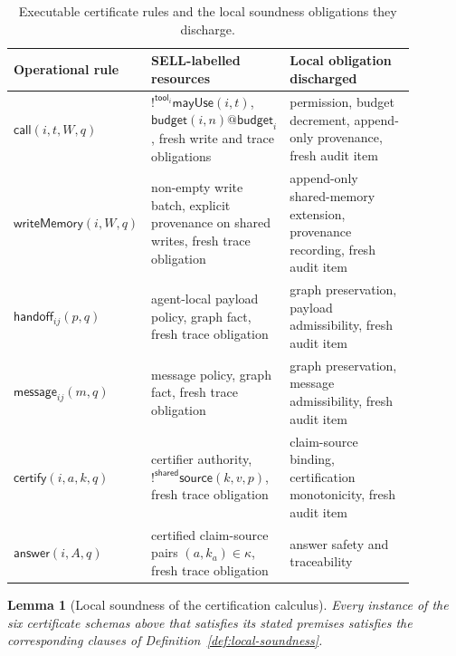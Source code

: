 \documentclass[a4paper,fleqn]{cas-sc}
\newtheorem{lemma}{Lemma}
\begin{document}
\begin{table}[htbp]
\centering
\small
\begin{tabular}{>{\raggedright\arraybackslash}p{0.22\linewidth}>{\raggedright\arraybackslash}p{0.32\linewidth}>{\raggedright\arraybackslash}p{0.34\linewidth}}
\toprule
Operational rule & SELL-labelled resources & Local obligation discharged \\
\midrule
\(\mathsf{call}(i,t,W,q)\) & \(!^{\mathsf{tool}_i}\mathsf{mayUse}(i,t)\), \(\mathsf{budget}(i,n)@\mathsf{budget}_i\), fresh write and trace obligations & permission, budget decrement, append-only provenance, fresh audit item \\
\(\mathsf{writeMemory}(i,W,q)\) & non-empty write batch, explicit provenance on shared writes, fresh trace obligation & append-only shared-memory extension, provenance recording, fresh audit item \\
\(\mathsf{handoff}_{ij}(p,q)\) & agent-local payload policy, graph fact, fresh trace obligation & graph preservation, payload admissibility, fresh audit item \\
\(\mathsf{message}_{ij}(m,q)\) & message policy, graph fact, fresh trace obligation & graph preservation, message admissibility, fresh audit item \\
\(\mathsf{certify}(i,a,k,q)\) & certifier authority, \(!^{\mathsf{shared}}\mathsf{source}(k,v,p)\), fresh trace obligation & claim-source binding, certification monotonicity, fresh audit item \\
\(\mathsf{answer}(i,A,q)\) & certified claim-source pairs \((a,k_a)\in\kappa\), fresh trace obligation & answer safety and traceability \\
\bottomrule
\end{tabular}
\caption{Executable certificate rules and the local soundness obligations they discharge.}
\label{tab:certificate-obligations}
\end{table}

\begin{lemma}[Local soundness of the certification calculus]\label{lem:calculus-local-soundness}
Every instance of the six certificate schemas above that satisfies its stated premises satisfies the corresponding clauses of Definition~\ref{def:local-soundness}.
\end{lemma}
\end{document}
